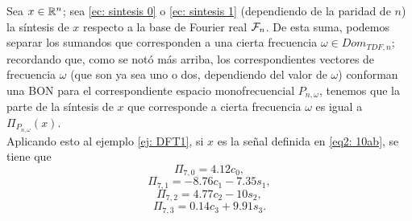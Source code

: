 \begin{nota}
\label{nota: proyeciones monof TDF}
Sea $x \in \mathbb{R}^{n}$; sea 
\eqref{ec: sintesis 0} o 
\eqref{ec: sintesis 1}
(dependiendo de la paridad de $n$)
la síntesis de $x$ respecto a la base de Fourier
real $\mathcal{F}_{n}$. De esta suma, podemos
separar los sumandos que corresponden a una
cierta frecuencia $\omega \in Dom_{TDF, n}$; recordando
que, como se notó más arriba, los correspondientes vectores
de frecuencia $\omega$ (que son ya sea uno o dos, dependiendo del valor
de $\omega$) conforman una BON para el correspondiente
espacio monofrecuencial 
$P_{n, \omega}$, tenemos que la parte de la 
síntesis de $x$ que corresponde a 
cierta frecuencia $\omega$ es igual a
$\Pi_{P_{n, \omega}}(x)$. \\

Aplicando esto al ejemplo \ref{ej: DFT1},
si $x$ es la señal definida en 
\ref{eq2: 10ab}, se tiene que
\[
\Pi_{7, 0} = 4.12 c_{0}, 
\]
\[
\Pi_{7, 1} = -8.76 c_{1} - 7.35 s_{1}, 
\]
\[
\Pi_{7, 2} = 4.77 c_{2} - 10 s_{2}, 
\]
\[
\Pi_{7, 3} = 0.14 c_{3} + 9.91 s_{3}.
\]
\end{nota}



